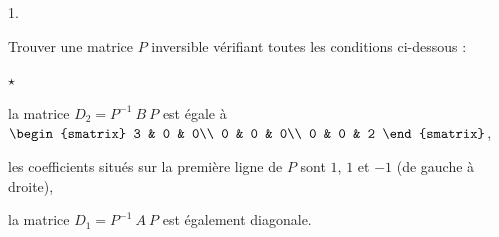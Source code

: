 \documentclass[11pt]{article}%
\begin{document}
\begin{noliste}{1.}
\item Trouver une matrice $P$ inversible vérifiant toutes les
  conditions ci-dessous :
  \begin{noliste}{$\star$}
  \item la matrice $D_{2} = P^{-1} \ B \ P$ est égale à
    $\begin{smatrix}
      3 & 0 & 0\\
      0 & 0 & 0\\
      0 & 0 & 2
    \end{smatrix}
    $,
  \item les coefficients situés sur la première ligne de $P$ sont $1$,
    $1$ et $-1$ (de gauche à droite),
  \item la matrice $D_{1} = P^{-1}\ A \ P$ est également diagonale.
  \end{noliste}


\end{noliste}
\end{document}
